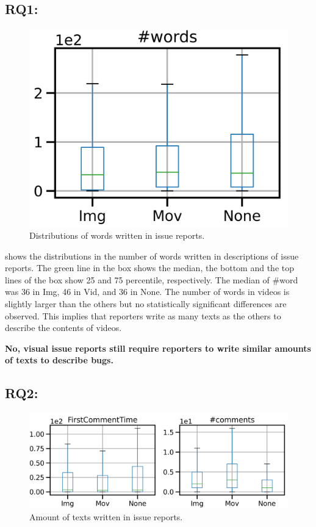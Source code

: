 

\subsection*{RQ1: \RQone{}}
\begin{figure}[t]
    \centering
    \includegraphics[width=0.5\linewidth]{./figures/words.png}
    \caption{Distributions of words written in issue reports. }
    \label{fig:words}
\end{figure}
 shows the distributions in the number of words written in descriptions of issue reports. The green line in the box shows the median, the bottom and the top lines of the box show 25 and 75 percentile, respectively. The median of \#word was 36 in Img, 46 in Vid, and 36 in None. The number of words in videos is slightly larger than the others but no statistically significant differences are observed. This implies that reporters write as many texts as the others to describe the contents of videos. 

{\bf No, visual issue reports still require reporters to write similar amounts of texts to describe bugs. 
}

\subsection*{RQ2: \RQtwo{}}
\begin{figure}[t]
    \centering
    \includegraphics[width=1\linewidth]{./figures/discussions.png}
    \caption{Amount of texts written in issue reports. }
    \label{fig:words}
\end{figure}

